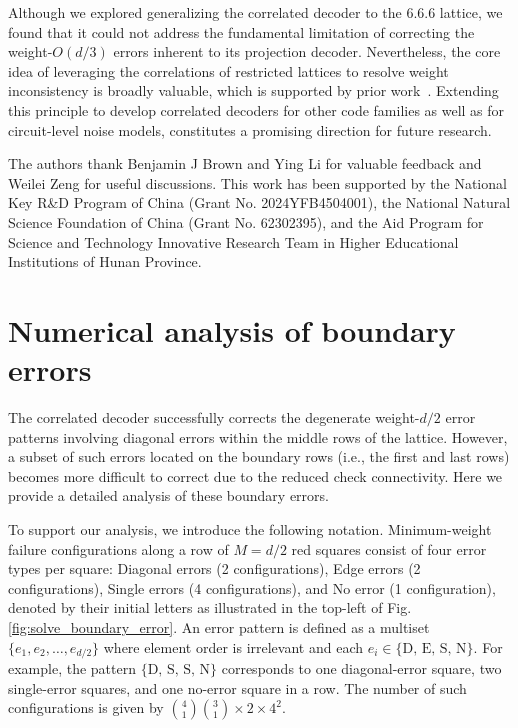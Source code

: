\documentclass[%
 reprint,
 amsmath,amssymb,
 aps,
]{revtex4-2}
\begin{document}
Although we explored generalizing the correlated decoder to the 6.6.6 lattice, we found that it could not address the fundamental limitation of correcting the weight-$O(d/3)$ errors inherent to its projection decoder.
Nevertheless, the core idea of leveraging the correlations of restricted lattices to resolve weight inconsistency is broadly valuable, which is supported by prior work~\cite{lee2025color}. Extending this principle to develop correlated decoders for other code families as well as for circuit-level noise models, constitutes a promising direction for future research.

\begin{acknowledgments} 
The authors thank Benjamin J Brown and Ying Li for valuable feedback and Weilei Zeng for useful discussions. 
This work has been supported by the National Key R\&D Program of China (Grant No. 2024YFB4504001), the National Natural Science Foundation of China (Grant No. 62302395), and the Aid Program for Science and Technology Innovative Research Team in Higher Educational Institutions of Hunan Province.
\end{acknowledgments}



\appendix
\section{\label{sec:appendix_A}Numerical analysis of boundary errors}
The correlated decoder successfully corrects the degenerate weight-$d/2$ error patterns involving diagonal errors within the middle rows of the lattice. However, a subset of such errors located on the boundary rows (i.e., the first and last rows) becomes more difficult to correct due to the reduced check connectivity. Here we provide a detailed analysis of these boundary errors. 

To support our analysis, we introduce the following notation. Minimum-weight failure configurations along a row of $M=d/2$ red squares consist of four error types per square: Diagonal errors (2 configurations), Edge errors (2 configurations), Single errors (4 configurations), and No error (1 configuration), denoted by their initial letters as illustrated in the top-left of Fig.\ref{fig:solve_boundary_error}. An error pattern is defined as a multiset $\{e_1, e_2, \dots, e_{d/2}\}$ where element order is irrelevant and each $e_i \in \{\text{D, E, S, N}\}$. For example, the pattern $\{\text{D, S, S, N}\}$ corresponds to one diagonal-error square, two single-error squares, and one no-error square in a row. The number of such configurations is given by $\binom{4}{1}\binom{3}{1}\times 2 \times 4 ^2$.
\end{document}

